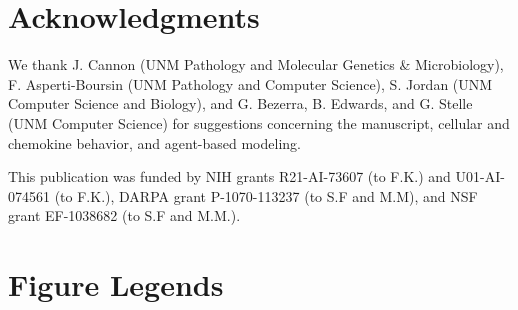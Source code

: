 \documentclass[10pt]{article}
\begin{document}
\section*{Acknowledgments}

We thank J. Cannon (UNM Pathology and Molecular Genetics \& Microbiology), F. Asperti-Boursin (UNM Pathology and Computer Science), S. Jordan (UNM Computer Science and Biology), and G. Bezerra, B. Edwards, and G. Stelle (UNM Computer Science) for suggestions concerning the manuscript, cellular and chemokine behavior, and agent-based modeling.

This publication was funded by NIH grants R21-AI-73607 (to F.K.) and U01-AI-074561 (to F.K.), DARPA grant P-1070-113237 (to S.F and M.M), and NSF grant EF-1038682 (to S.F and M.M.).



\section*{Figure Legends}
\end{document}
